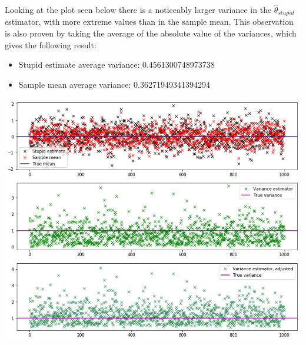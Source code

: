 Looking at the plot seen below there is a noticeably larger variance in the $\hat{\theta}_{stupid}$ estimator, with more extreme values than in the sample mean. This observation is also proven by taking the average of the absolute value of the variances, which gives the following result:
\begin{itemize}
\item Stupid estimate average variance: 0.4561300748973738
\item Sample mean average variance: 0.36271949341394294
\end{itemize}
\includegraphics[width=1\linewidth]{mean.png}